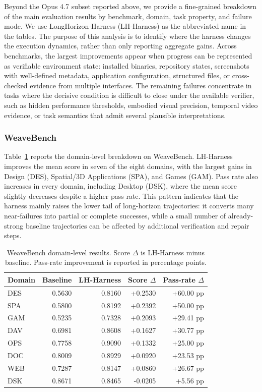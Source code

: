 Beyond the Opus 4.7 subset reported above, we provide a fine-grained breakdown of the main evaluation results by benchmark, domain, task property, and failure mode. We use LongHorizon-Harness (LH-Harness) as the abbreviated name in the tables. The purpose of this analysis is to identify where the harness changes the execution dynamics, rather than only reporting aggregate gains. Across benchmarks, the largest improvements appear when progress can be represented as verifiable environment state: installed binaries, repository states, screenshots with well-defined metadata, application configuration, structured files, or cross-checked evidence from multiple interfaces. The remaining failures concentrate in tasks where the decisive condition is difficult to close under the available verifier, such as hidden performance thresholds, embodied visual precision, temporal video evidence, or task semantics that admit several plausible interpretations.

\subsubsection{WeaveBench}
\label{app:fine-grained-weavebench}

Table~\ref{tab:weavebench-domain-breakdown} reports the domain-level breakdown on WeaveBench. LH-Harness improves the mean score in seven of the eight domains, with the largest gains in Design (DES), Spatial/3D Applications (SPA), and Games (GAM). Pass rate also increases in every domain, including Desktop (DSK), where the mean score slightly decreases despite a higher pass rate. This pattern indicates that the harness mainly raises the lower tail of long-horizon trajectories: it converts many near-failures into partial or complete successes, while a small number of already-strong baseline trajectories can be affected by additional verification and repair steps.

\begin{table}[t]
\caption{WeaveBench domain-level results. Score $\Delta$ is LH-Harness minus baseline. Pass-rate improvement is reported in percentage points.}
\label{tab:weavebench-domain-breakdown}
\centering
\small
\setlength{\tabcolsep}{5pt}
\begin{tabular}{lrrrr}
\toprule
Domain & Baseline & LH-Harness & Score $\Delta$ & Pass-rate $\Delta$ \\
\midrule
DES & 0.5630 & 0.8160 & +0.2530 & +60.00 pp \\
SPA & 0.5800 & 0.8192 & +0.2392 & +50.00 pp \\
GAM & 0.5235 & 0.7328 & +0.2093 & +29.41 pp \\
DAV & 0.6981 & 0.8608 & +0.1627 & +30.77 pp \\
OPS & 0.7758 & 0.9090 & +0.1332 & +25.00 pp \\
DOC & 0.8009 & 0.8929 & +0.0920 & +23.53 pp \\
WEB & 0.7287 & 0.8147 & +0.0860 & +26.67 pp \\
DSK & 0.8671 & 0.8465 & -0.0205 & +5.56 pp \\
\bottomrule
\end{tabular}
\end{table}

